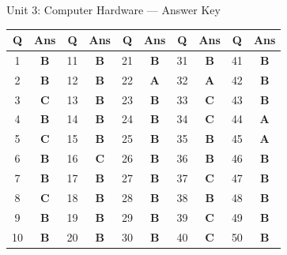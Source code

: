 \begin{answerkeytable}{Unit 3: Computer Hardware --- Answer Key}
\begin{tabular}{*{10}{c}}
\toprule
\textbf{Q} & \textbf{Ans} & \textbf{Q} & \textbf{Ans} & \textbf{Q} & \textbf{Ans} & \textbf{Q} & \textbf{Ans} & \textbf{Q} & \textbf{Ans} \\
\midrule
1 & \textbf{B} & 11 & \textbf{B} & 21 & \textbf{B} & 31 & \textbf{B} & 41 & \textbf{B} \\
2 & \textbf{B} & 12 & \textbf{B} & 22 & \textbf{A} & 32 & \textbf{A} & 42 & \textbf{B} \\
3 & \textbf{C} & 13 & \textbf{B} & 23 & \textbf{B} & 33 & \textbf{C} & 43 & \textbf{B} \\
4 & \textbf{B} & 14 & \textbf{B} & 24 & \textbf{B} & 34 & \textbf{C} & 44 & \textbf{A} \\
5 & \textbf{C} & 15 & \textbf{B} & 25 & \textbf{B} & 35 & \textbf{B} & 45 & \textbf{A} \\
6 & \textbf{B} & 16 & \textbf{C} & 26 & \textbf{B} & 36 & \textbf{B} & 46 & \textbf{B} \\
7 & \textbf{B} & 17 & \textbf{B} & 27 & \textbf{B} & 37 & \textbf{C} & 47 & \textbf{B} \\
8 & \textbf{C} & 18 & \textbf{B} & 28 & \textbf{B} & 38 & \textbf{B} & 48 & \textbf{B} \\
9 & \textbf{B} & 19 & \textbf{B} & 29 & \textbf{B} & 39 & \textbf{C} & 49 & \textbf{B} \\
10 & \textbf{B} & 20 & \textbf{B} & 30 & \textbf{B} & 40 & \textbf{C} & 50 & \textbf{B} \\
\bottomrule
\end{tabular}
\end{answerkeytable}

